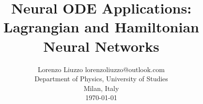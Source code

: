 \documentclass[twoside,11pt]{article}
\begin{document}
\title{
  Neural ODE Applications: \\ 
  Lagrangian and Hamiltonian Neural Networks
}

\author{
  \name Lorenzo Liuzzo 
  \email lorenzoliuzzo@outlook.com \\
  \addr Department of Physics, University of Studies \\ Milan, Italy \\
  \today
}

\maketitle

\begin{abstract}
  \lipsum[1]
\end{abstract}






\newpage


\newpage
\nocite{*}


\end{document}
